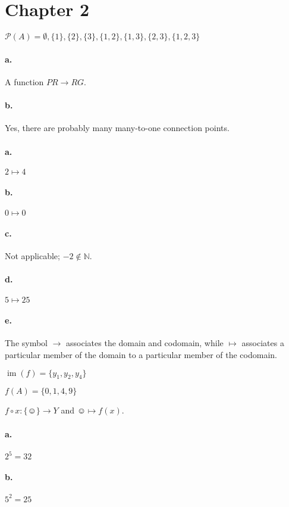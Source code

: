 \section*{Chapter 2}


$\mathcal{P}(A) = \emptyset, \{1\}, \{2\}, \{3\}, \{1,2\}, \{1,3\}, \{2,3\}, \{1,2,3\}$


\paragraph{a.}
A function $PR \to RG$.
\paragraph{b.}
Yes, there are probably many many-to-one connection points.


\paragraph{a.}
$2 \mapsto 4$
\paragraph{b.}
$0 \mapsto 0$
\paragraph{c.}
Not applicable; $-2 \not\in \mathbb{N}$.
\paragraph{d.}
$5 \mapsto 25$
\paragraph{e.}
The symbol $\to$ associates the domain and codomain, while $\mapsto$
associates a particular member of the domain to a particular member of
the codomain.


$\operatorname{im}(f) = \{y_1, y_2, y_4\}$


$f(A) = \{0,1,4,9\}$


$f \circ x \colon \{\smiley\} \to Y$ and $\smiley \mapsto f(x)$.


\paragraph{a.}
$2^5 = 32$
\paragraph{b.}
$5^2 = 25$


